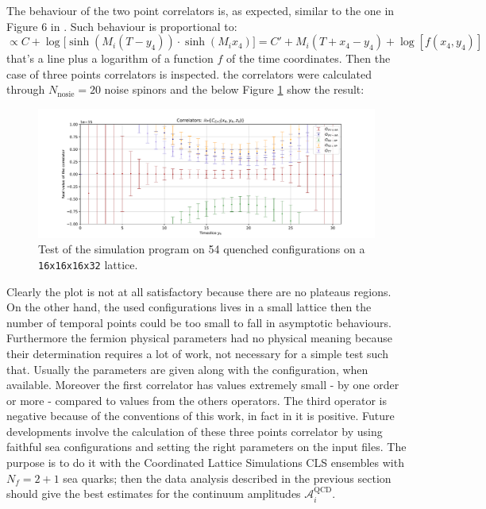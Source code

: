 \documentclass[english, LaM, oneside, noexaminfo]{sapthesis}
\begin{document}
\newline
The behaviour of the two point correlators is, as expected, similar to the one in Figure 6 in \cite{OBC-tm}.
Such behaviour is proportional to:
\begin{equation*}
    \propto C + \log\big[\sinh \left(M_i (T-y_4)\right)\cdot \sinh \left(M_i x_4\right)\big] = C' + M_i \left(T+x_4-y_4\right) + \log \left[f(x_4,y_4)\right]
\end{equation*}
that's a line plus a logarithm of a function $f$ of the time coordinates.
\newline
Then the case of three points correlators is inspected.
the correlators were calculated through $N_\text{nosie} = 20$ noise spinors and the below Figure \ref{fig:pureYM} show the result:
\begin{figure}[!h]
    \centering
    \includegraphics[width=\textwidth]{imgs-MSc-thesis/pureYM-3pts.pdf}
    \caption{Test of the simulation program on 54 quenched configurations on a \texttt{16x16x16x32} lattice.}
    \label{fig:pureYM}
\end{figure}
\newline
Clearly the plot is not at all satisfactory because there are no plateaus regions.
On the other hand, the used configurations lives in a small lattice then the number of temporal points could be too small to fall in asymptotic behaviours.
Furthermore the fermion physical parameters had no physical meaning because their determination requires a lot of work, not necessary for a simple test such that.
Usually the parameters are given along with the configuration, when available.
Moreover the first correlator has values extremely small - by one order or more - compared to values from the others operators.
The third operator is negative because of the conventions of this work, in fact in \cite{KMBSM} it is positive.
\newline
Future developments involve the calculation of these three points correlator by using faithful sea configurations and setting the right parameters on the input files.
The purpose is to do it with the Coordinated Lattice Simulations CLS ensembles with $N_f = 2+1$ sea quarks;
then the data analysis described in the previous section should give the best estimates for the continuum amplitudes $\mathcal{A}^\text{QCD}_i$.
\end{document}
